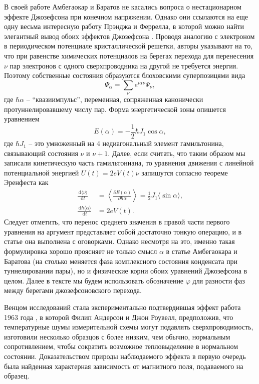 \documentclass[14pt, a4paper]{extreport}
\newcommand{\diff}{\,\mathrm{d}}
\numberwithin{equation}{section}
\begin{document}
В своей работе Амбегаокар и Баратов не касались вопроса о нестационарном эффекте Джозефсона при конечном напряжении. Однако они ссылаются на еще одну весьма интересную работу Прэнджа и Феррелла, в которой можно найти элегантный вывод обоих эффектов Джозефсона \cite{ferrell1963self}. Проводя аналогию с электроном в периодическом потенциале кристаллической решетки, авторы указывают на то, что при равенстве химических потенциалов на берегах перехода для перенесения $\nu$ пар электронов с одного сверхпроводника на другой не требуется энергия. Поэтому собственные состояния образуются блоховскими суперпозицями вида
\begin{equation}
	\Psi_\alpha = \sum_\nu e^{i\alpha \nu} \Psi_\nu,
\end{equation}
где $\hbar\alpha$ -- ``квазиимпульс'', переменная, сопряженная канонически протуннелировавшему числу пар. Форма энергетической зоны опишется уравнением
\begin{equation}
	E(\alpha) = -\frac{1}{2}\hbar J_1 \cos \alpha,
\end{equation} 
где $\hbar J_1$ -- это умноженный на 4 недиагональный элемент гамильтонина, связывающий состояния $\nu$ и $\nu+1$. Далее, если считать, что таким образом мы записали кинетическую часть гамильтониана, то уравнения движения с линейной потенциальной энергией $U(t) = 2eV(t)\nu$ запишутся согласно теореме Эренфеста как 
\begin{align}
	\frac{\diff \langle \nu \rangle }{\diff t} &=\left\langle \frac{\partial E(\alpha)}{ \partial \hbar\alpha}\right\rangle = \frac{1}{2} J_1 \langle \sin \alpha \rangle,\\
	\frac{\diff \hbar\langle  \alpha \rangle}{\diff t} &= 2 e V(t).\label{eq:JJ2}
\end{align}
Следует отметить, что перенос среднего значения в правой части первого уравнения на аргумент представляет собой достаточно тонкую операцию, и в статье она выполнена с оговорками. Однако несмотря на это, именно такая формулировка хорошо проясняет не только смысл $\alpha$ в статье Амбегаокара и Баратова (на столько меняется фаза комплексного состояния конденсата при туннелировании пары), но и физические корни обоих уравнений Джозефсона в целом. Далее в тексте мы будем использовать обозначение $\varphi$ для разности фаз между берегами джозефсоновского перехода.

Венцом исследований стала экспериментально подтвердившая эффект работа 1963 года \cite{anderson1963probable}, в которой Филип Андерсон и Джон Роувелл, предположив, что температурные шумы измерительной схемы могут подавлять сверхпроводимость, изготовили несколько образцов с более низким, чем обычно, нормальным сопротивлением, чтобы сократить возможное тепловыделение в нормальном состоянии. Доказательством природы наблюдаемого эффекта в первую очередь была найденная характерная зависимость от магнитного поля, подаваемого на образец.
\end{document}
